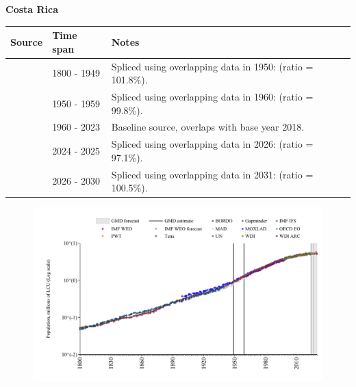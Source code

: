 \documentclass[12pt,a4paper,landscape]{article}
\begin{document}
\begin{adjustbox}{max totalsize={\paperwidth}{\paperheight},center}
\begin{minipage}[t][\textheight][t]{\textwidth}
\vspace*{0.5cm}
{}
\begin{center}
{\Large\bfseries Costa Rica}
\end{center}
\vspace{0.5cm}
\begin{table}[H]
\centering
\small
\begin{tabular}{|l|l|l|}
\hline
\textbf{Source} & \textbf{Time span} & \textbf{Notes} \\
\hline
\rowcolor{white}\cite{Gapminder}& 1800 - 1949 &Spliced using overlapping data in 1950: (ratio = 101.8\%).\\
\rowcolor{lightgray}\cite{IMF_IFS}& 1950 - 1959 &Spliced using overlapping data in 1960: (ratio = 99.8\%).\\
\rowcolor{white}\cite{WDI}& 1960 - 2023 &Baseline source, overlaps with base year 2018.\\
\rowcolor{lightgray}\cite{OECD_EO}& 2024 - 2025 &Spliced using overlapping data in 2026: (ratio = 97.1\%).\\
\rowcolor{white}\cite{Gapminder}& 2026 - 2030 &Spliced using overlapping data in 2031: (ratio = 100.5\%).\\
\hline
\end{tabular}
\end{table}
\begin{figure}[H]
\centering
\includegraphics[width=\textwidth,height=0.6\textheight,keepaspectratio]{graphs/CRI_pop.pdf}
\end{figure}
\end{minipage}
\end{adjustbox}
\end{document}
